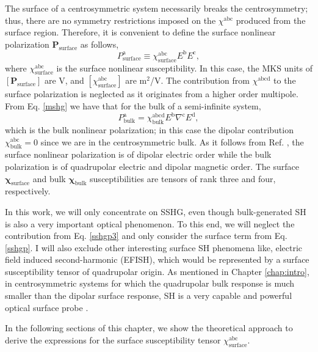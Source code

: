 The surface of a centrosymmetric system necessarily breaks the centrosymmetry;
thus, there are no symmetry restrictions imposed on the $\chi^{\mathrm{abc}}$
produced from the surface region. Therefore, it is convenient to define the
surface nonlinear polarization $\mathbf{P}_{\mathrm{surface}}$ as follows,
\begin{equation}\label{sshgp}
P^{\mathrm{a}}_{\mathrm{surface}}
\equiv \chi^{\mathrm{abc}}_{\mathrm{surface}}E^{\mathrm{b}}E^{\mathrm{c}},
\end{equation}
where $\chi^{\mathrm{abc}}_{\mathrm{surface}}$ is the surface nonlinear
susceptibility. In this case, the MKS units of $[\mathbf{P}_{\mathrm{surface}}]$
are V, and $[\chi^{\mathrm{abc}}_{\mathrm{surface}}]$ are m$^{2}$/V. The
contribution from $\chi^{\mathrm{abcd}}$ to the surface polarization is
neglected as it originates from a higher order multipole. From Eq. \eqref{mshg}
we have that for the bulk of a semi-infinite system,
\begin{equation}\label{sshgp3}
P^{\mathrm{a}}_{\mathrm{bulk}}
= \chi^{\mathrm{abcd}}_{\mathrm{bulk}}
  E^{\mathrm{b}}\nabla^{\mathrm{c}}E^{\mathrm{d}},  
\end{equation}
which is the bulk nonlinear polarization; in this case the dipolar contribution
$\chi^{\mathrm{abc}}_{\mathrm{bulk}} = 0$ since we are in the centrosymmetric
bulk. As it follows from Ref. \cite{bloembergenPR62}, the surface nonlinear
polarization is of dipolar electric order while the bulk polarization is of
quadrupolar electric and dipolar magnetic order. The surface
$\boldsymbol{\chi}_{\mathrm{surface}}$ and bulk
$\boldsymbol{\chi}_{\mathrm{bulk}}$ susceptibilities are tensors of rank
three and four, respectively.

In this work, we will only concentrate on SSHG, even though bulk-generated SH is
also a very important optical phenomenon. To this end, we will neglect the
contribution from Eq. \eqref{sshgp3} and only consider the surface term from Eq.
\eqref{sshgp}. I will also exclude other interesting surface SH phenomena like,
electric field induced second-harmonic (EFISH), which would be represented by a
surface susceptibility tensor of quadrupolar origin. As mentioned in Chapter
\ref{chap:intro}, in centrosymmetric systems for which the quadrupolar bulk
response is much smaller than the dipolar surface response, SH is a very capable
and powerful optical surface probe \cite{downerSIA01}.

In the following sections of this chapter, we show the theoretical
approach to derive the expressions for the surface susceptibility tensor
$\chi^{\mathrm{abc}}_{\mathrm{surface}}$.

